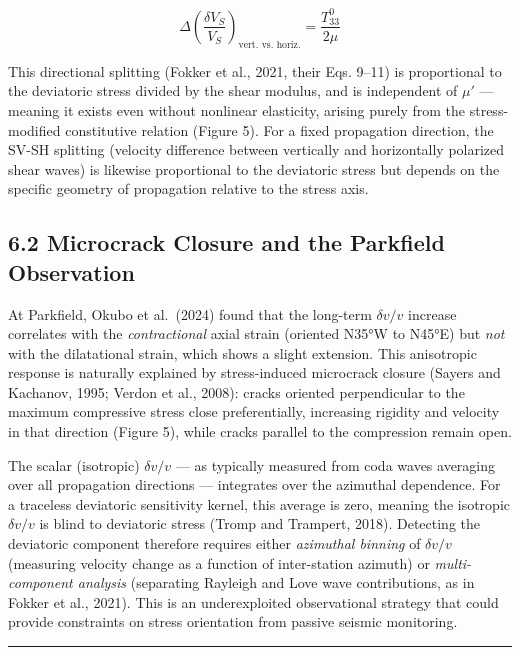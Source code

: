 \documentclass[12pt]{article}
\begin{document}
\[\Delta\left(\frac{\delta V_S}{V_S}\right)_{\text{vert. vs. horiz.}} = \frac{T_{33}^0}{2\mu} \tag{11b}\]

This directional splitting (Fokker et al., 2021, their Eqs. 9--11) is
proportional to the deviatoric stress divided by the shear modulus, and
is independent of \(\mu'\) --- meaning it exists even without nonlinear
elasticity, arising purely from the stress-modified constitutive
relation (Figure 5). For a fixed propagation direction, the SV-SH
splitting (velocity difference between vertically and horizontally
polarized shear waves) is likewise proportional to the deviatoric stress
but depends on the specific geometry of propagation relative to the
stress axis.

\subsection{6.2 Microcrack Closure and the Parkfield
Observation}\label{microcrack-closure-and-the-parkfield-observation}

At Parkfield, Okubo et al.~(2024) found that the long-term
\(\delta v/v\) increase correlates with the \emph{contractional} axial
strain (oriented N35°W to N45°E) but \emph{not} with the dilatational
strain, which shows a slight extension. This anisotropic response is
naturally explained by stress-induced microcrack closure (Sayers and
Kachanov, 1995; Verdon et al., 2008): cracks oriented perpendicular to
the maximum compressive stress close preferentially, increasing rigidity
and velocity in that direction (Figure 5), while cracks parallel to the
compression remain open.

The scalar (isotropic) \(\delta v/v\) --- as typically measured from
coda waves averaging over all propagation directions --- integrates over
the azimuthal dependence. For a traceless deviatoric sensitivity kernel,
this average is zero, meaning the isotropic \(\delta v/v\) is blind to
deviatoric stress (Tromp and Trampert, 2018). Detecting the deviatoric
component therefore requires either \emph{azimuthal binning} of
\(\delta v/v\) (measuring velocity change as a function of inter-station
azimuth) or \emph{multi-component analysis} (separating Rayleigh and
Love wave contributions, as in Fokker et al., 2021). This is an
underexploited observational strategy that could provide constraints on
stress orientation from passive seismic monitoring.

\begin{center}\rule{0.5\linewidth}{0.5pt}\end{center}
\end{document}
